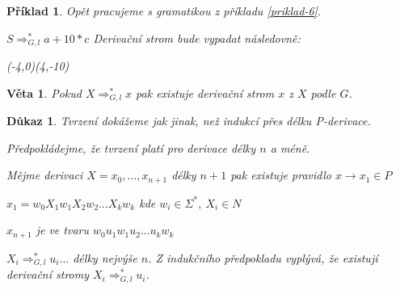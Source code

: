 \documentclass[10pt, a4paper, titlepage]{article}
\theoremstyle{note}
\newtheorem{veta}{\textbf{Věta}}
\newtheorem{dukaz}{\textbf{Důkaz}}
\newtheorem{priklad}{\textbf{Příklad}}
\begin{document}
\begin{priklad}
Opět pracujeme s gramatikou z příkladu \ref{priklad-6}.

$S \Rightarrow_{G,l}^* a+10*c$ \quad Derivační strom bude vypadat následovně:

\begin{center}
\begin{VCPicture}{(-4,0)(4,-10)}
\MediumState
{}

\end{VCPicture}
\end{center}
\end{priklad}

\begin{veta}
Pokud $X \Rightarrow_{G,l}^* x$ pak existuje derivační strom $x$ z $X$ podle $G$.
\end{veta}
\begin{dukaz}
Tvrzení dokážeme jak jinak, než indukcí přes délku P-derivace.

Předpokládejme, že tvrzení platí pro derivace délky $n$ a méně.

Mějme derivaci $X=x_0,\ldots,x_{n+1}$ délky $n+1$ pak existuje pravidlo $x \rightarrow x_1 \in P$

$x_1=w_0X_1w_1X_2w_2 \ldots X_kw_k$ kde $w_i \in \Sigma^*,\ X_i\in N$

$x_{n+1}$ je ve tvaru $w_0u_1w_1u_2\ldots u_kw_k$

$X_i \Rightarrow_{G,l}^* u_i \ldots$ délky nejvýše $n$. Z indukčního předpokladu vyplývá, že existují derivační stromy $X_i \Rightarrow_{G,l}^* u_i$.
\end{dukaz}
\end{document}
